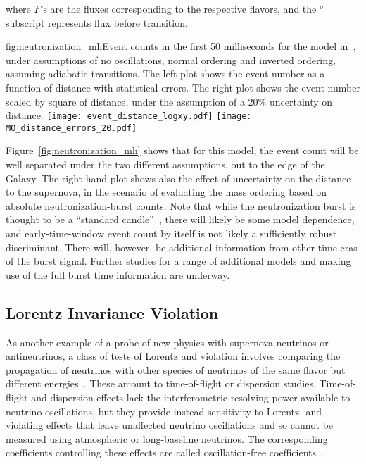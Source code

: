 where $F$'s are the fluxes corresponding to the respective flavors,
and the $^o$ subscript represents flux before transition.

\begin{dunefigure}[MH1]{fig:neutronization_mh}{Event counts in the
    first 50 milliseconds for the model in~\cite{Huedepohl:2009wh}, under
    assumptions of no oscillations, normal ordering and inverted
    ordering, assuming adiabatic  transitions.  The left plot
    shows the event number as a function of distance with statistical
    errors.  The right plot
    shows the event number scaled by square of distance, under the
    assumption of a 20\% uncertainty on distance. }
\texttt{[image: event\_distance\_logxy.pdf]}
\texttt{[image: MO\_distance\_errors\_20.pdf]}
\end{dunefigure}

Figure~\ref{fig:neutronization_mh} shows that for this model, the event count will be
well separated under the two different assumptions, out to the edge of
the Galaxy.  The right hand plot shows also the effect of uncertainty
on the distance to the supernova, in the scenario of evaluating the
mass ordering based on absolute neutronization-burst counts.
Note that while the neutronization burst is thought to be a ``standard
candle''~\cite{Mirizzi:2015eza}, there will likely be some model
dependence, and early-time-window event count by
itself is not likely a sufficiently robust discriminant.
There will, however, be additional information from other time eras of the burst signal.  Further studies for a
range of additional models and making use of the full burst
time information are underway.


\subsection{Lorentz Invariance Violation}

As another example of a probe of new physics with supernova neutrinos or antineutrinos,
a class of tests of Lorentz and  violation involves comparing the propagation of neutrinos with other species of neutrinos of the same flavor but different energies~\cite{Kostelecky:2003cr,Kostelecky:2003xn,Kostelecky:2011gq,Diaz:2009qk}. These amount to time-of-flight or dispersion studies.
Time-of-flight and dispersion effects lack the interferometric resolving power available to neutrino oscillations, but they provide instead sensitivity to Lorentz- and -violating effects that  leave unaffected neutrino oscillations
and so cannot be measured using atmospheric or long-baseline neutrinos.
The corresponding  coefficients controlling these effects are called oscillation-free coefficients~\cite{Kostelecky:2011gq}.

